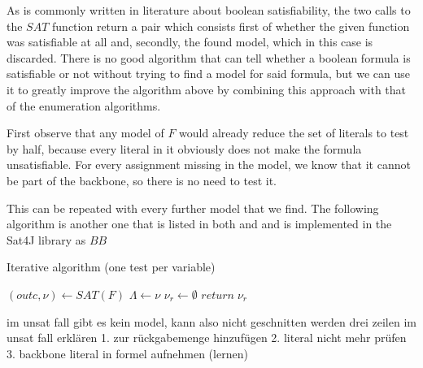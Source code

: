 As is commonly written in literature about boolean satisfiability, the two calls to the $SAT$ function return a pair which consists first of whether the given function was satisfiable at all and, secondly, the found model, which in this case is discarded. There is no good algorithm that can tell whether a boolean formula is satisfiable or not without trying to find a model for said formula, but we can use it to greatly improve the algorithm above by combining this approach with that of the enumeration algorithms.

First observe that any model of $F$ would already reduce the set of literals to test by half, because every literal in it obviously does not make the formula unsatisfiable. For every assignment missing in the model, we know that it cannot be part of the backbone, so there is no need to test it. 

This can be repeated with every further model that we find. The following algorithm is another one that is listed in both \cite{mjl10} and \cite{mjl15} and is implemented in the Sat4J library as $BB$

\begin{algorithm}
\caption{{\sc Iterative algorithm (one test per variable)}}
\DontPrintSemicolon
{}

$(outc,\nu) \gets SAT(F)$\;
$\Lambda \gets \nu$\;
$\nu_r \gets \emptyset$\;
$return \; \nu_r$\;
\end{algorithm}


im unsat fall gibt es kein model, kann also nicht geschnitten werden
drei zeilen im unsat fall erklären
1. zur rückgabemenge hinzufügen
2. literal nicht mehr prüfen
3. backbone literal in formel aufnehmen (lernen)
